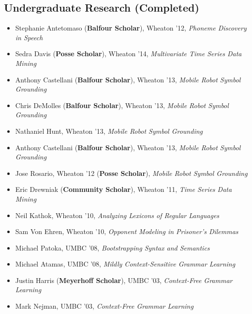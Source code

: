 \documentclass[12pt]{article}
\begin{document}
\subsection*{Undergraduate Research (Completed) }
\begin{itemize}
  \setlength{\itemsep}{1pt}
  \setlength{\parskip}{0pt}
  \setlength{\parsep}{0pt}
  \item Stephanie Antetomaso ({\bf Balfour Scholar}), Wheaton '12, {\em Phoneme Discovery in Speech}
  \item Sedra Davis ({\bf Posse Scholar}), Wheaton '14, {\em Multivariate Time Series Data Mining}
  \item Anthony Castellani ({\bf Balfour Scholar}), Wheaton '13, {\em Mobile Robot Symbol Grounding}
  \item Chris DeMolles ({\bf Balfour Scholar}), Wheaton '13, {\em Mobile Robot Symbol Grounding}
  \item Nathaniel Hunt, Wheaton '13, {\em Mobile Robot Symbol Grounding}
  \item Anthony Castellani ({\bf Balfour Scholar}), Wheaton '13, {\em Mobile Robot Symbol Grounding}
  \item Jose Rosario, Wheaton '12 ({\bf Posse Scholar}), {\em Mobile Robot Symbol Grounding}
  \item Eric Drewniak ({\bf Community Scholar}), Wheaton '11, {\em Time Series Data Mining}
  \item Neil Kathok, Wheaton '10, {\em Analyzing Lexicons of Regular Languages}
  \item Sam Von Ehren, Wheaton '10, {\em Opponent Modeling in Prisoner's Dilemmas}
  \item Michael Patoka, UMBC '08, {\em Bootstrapping Syntax and Semantics}
  \item Michael Atamas, UMBC '08, {\em Mildly Context-Sensitive Grammar Learning}
  \item Justin Harris ({\bf Meyerhoff Scholar}), UMBC '03, {\em Context-Free Grammar Learning}
  \item Mark Nejman, UMBC '03, {\em Context-Free Grammar Learning}
\end{itemize}

\newpage
\end{document}
